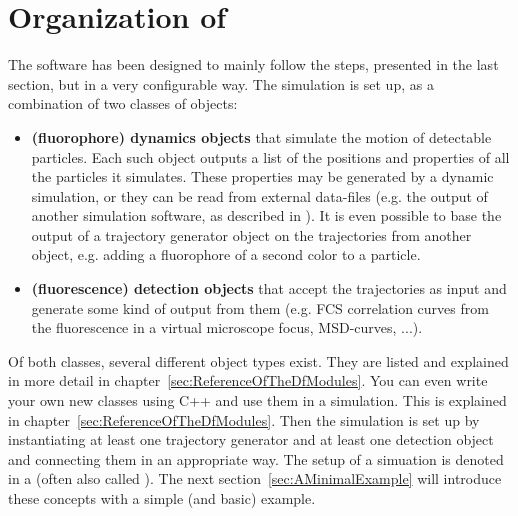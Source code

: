 \section{Organization of \df}
\label{sec:OrganizationOfDf}
The software \df has been designed to mainly follow the steps, presented in the last section, but in a very configurable way. The simulation is set up, as a combination of two classes of objects:
\begin{itemize}
	\item \textbf{(fluorophore) dynamics objects} that simulate the motion of detectable particles. Each such object outputs a list of the positions and properties of all the particles it simulates. These properties may be generated by a dynamic simulation, or they can be read from external data-files (e.g. the output of another simulation software, as described in \cite{WOCJAN2009}). It is even possible to base the output of a trajectory generator object on the trajectories from another object, e.g. adding a fluorophore of a second color to a particle. 
	\item \textbf{(fluorescence) detection objects} that accept the trajectories as input and generate some kind of output from them (e.g. FCS correlation curves from the fluorescence in a virtual microscope focus, MSD-curves, ...).
\end{itemize}
Of both classes, several different object types exist. They are listed and explained in more detail in chapter~\ref{sec:ReferenceOfTheDfModules}. You can even write your own new classes using C++ and use them in a simulation. This is explained in chapter~\ref{sec:ReferenceOfTheDfModules}. Then the simulation is set up by instantiating at least one trajectory generator and at least one detection object and connecting them in an appropriate way. The setup of a simuation is denoted in a  (often also called ). The next section~\ref{sec:AMinimalExample} will introduce these concepts with a simple (and basic) example.


